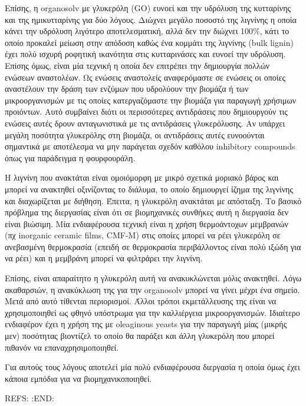 \documentclass[11pt]{article}
\begin{document}
\begin{description}
Επίσης, η organosolv με γλυκερόλη (GO) ευνοεί και την υδρόλυση της κυτταρίνης και της ημικυτταρίνης για δύο λόγους. Διώχνει μεγάλο ποσοστό της λιγνίνης η οποία κάνει την υδρόλυση λιγότερο αποτελεσματική, αλλά δεν την διώχνει 100\%, κάτι το οποίο προκαλεί μείωση στην απόδοση καθώς ένα κομμάτι της λιγνίνης (bulk lignin) έχει πολύ ισχυρή ροφητική ικανότητα στις κυτταρινάσες και ευνοεί την υδρόλυση. Επίσης όμως, είναι μία τεχνική η οποία δεν επιτρέπει την δημιουργία πολλών ενώσεων αναστολέων. Ως ενώσεις αναστολείς αναφερόμαστε σε ενώσεις οι οποίες αναστέλουν την δράση των ενζύμων που υδρολύουν την βιομάζα ή των μικροοργανισμών με τις οποίες κατεργαζόμαστε την βιομάζα για παραγωγή χρήσιμων προιόντων. Αυτό συμβαίνει διότι οι περισσότερες αντιδράσεις που δημιουργούν τις ενώσεις αυτές δρουν ανταγωνιστικά με τις αντιδράσεις γλυκερόλυσης. Αν υπάρχει μεγάλη ποσότητα γλυκερόλης στη βιομάζα, οι αντιδράσεις αυτές ευνοούνται σημαντικά με αποτέλεσμα να μην παράγεται σχεδόν καθόλου inhibitory compounds όπως για παράδειγμα η φουρφουράλη.

Η λιγνίνη που ανακτάται είναι ομοιόμορφη με μικρό σχετικά μοριακό βάρος και μπορεί να ανακτηθεί οξινίζοντας το διάλυμα, το οποίο δημιουργεί ίζημα της λιγνίνης και διαχωρίζεται με διήθηση. Έπειτα, η γλυκερόλη ανακτάται με απόσταξη. Το βασικό πρόβλημα της διεργασίας είναι ότι σε βιομηχανικές συνθήκες αυτή η διεργασία δεν είναι βιώσιμη. Μία ενδιαφέρουσα τεχνική είναι η χρήση θερμοάντοχων μεμβρανών (πχ inorganic ceramic films, CMF-M) στις οποίες μπορεί να ρέει γλυκερόλη σε ανεβασμένη θερμοκρασία (επειδή σε θερμοκρασία περιβάλλοντος είναι πολύ ιξώδη για να ρέει) και η μεμβράνη μπορεί να φιλτράρει την λιγνίνη.

Επίσης, είναι απαραίτητο η γλυκερόλη αυτή να ανακυκλώνεται μόλις ανακτηθεί. Λόγω ακαθαρσιών, η ανακύκλωση της για την organosolv μπορεί να γίνει μέχρι ένα σημείο. Μετά από αυτό τίθενται περιορισμοί. Άλλοι τρόποι εκμετάλλευσης της είναι να χρησιμοποιηθεί ως φθηνό υπόστρωμα για την καλλιέργεια μικροοργανισμών. Ιδιαίτερο ενδιαφέρον έχει η χρήση της με oleaginous yeasts για την παραγωγή μίας (μικρής μεν) ποσότητας βιοντίζελ το οποίο θα παράξει και άλλη γλυκερόλη που μπορεί πιθανόν να επαναχρησιμοποιηθεί.

Για αυτούς τους λόγους αποτελεί μία πολύ ενδιαφέρουσα διεργασία η οποία όμως έχει κάποια εμπόδια για να βιομηχανικοποιηθεί.
\end{description}

REFS: \cite{fernandez-bolanosSteamexplosionOliveStones2001}
:END:
\end{document}
